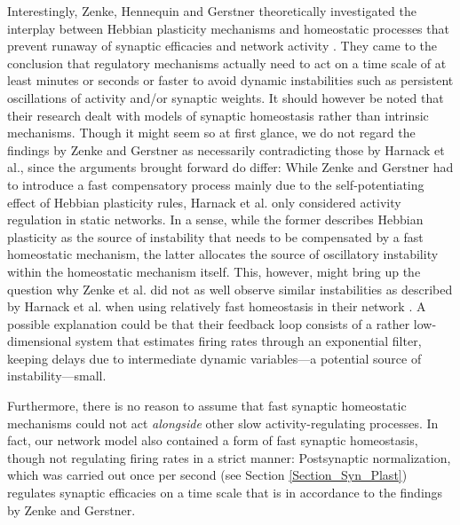\documentclass[10pt,a4paper]{article}
\begin{document}
Interestingly, Zenke, Hennequin and Gerstner theoretically investigated the interplay between Hebbian plasticity mechanisms and homeostatic processes that prevent runaway of synaptic efficacies and network activity \cite{Zenke_2013,Zenke_2017}. They came to the conclusion that regulatory mechanisms actually need to act on a time scale of at least minutes or seconds or faster to avoid dynamic instabilities such as persistent oscillations of activity and/or synaptic weights. It should however be noted that their research dealt with models of synaptic homeostasis rather than intrinsic mechanisms. Though it might seem so at first glance, we do not regard the findings by Zenke and Gerstner as necessarily contradicting those by Harnack et al., since the arguments brought forward do differ: While Zenke and Gerstner had to introduce a fast compensatory process mainly due to the self-potentiating effect of Hebbian plasticity rules, Harnack et al. only considered activity regulation in static networks. In a sense, while the former describes Hebbian plasticity as the source of instability that needs to be compensated by a fast homeostatic mechanism, the latter allocates the source of oscillatory instability within the homeostatic mechanism itself. This, however, might bring up the question why Zenke et al. did not as well observe similar instabilities as described by Harnack et al. when using relatively fast homeostasis in their network \cite{Zenke_2013}. A possible explanation could be that their feedback loop consists of a rather low-dimensional system that estimates firing rates through an exponential filter, keeping delays due to intermediate dynamic variables---a potential source of instability---small.

Furthermore, there is no reason to assume that fast synaptic homeostatic mechanisms could not act \emph{alongside} other slow activity-regulating processes. In fact, our network model also contained a form of fast synaptic homeostasis, though not regulating firing rates in a strict manner: Postsynaptic normalization, which was carried out once per second (see Section \ref{Section_Syn_Plast}) regulates synaptic efficacies on a time scale  that is in accordance to the findings by Zenke and Gerstner.
\end{document}
